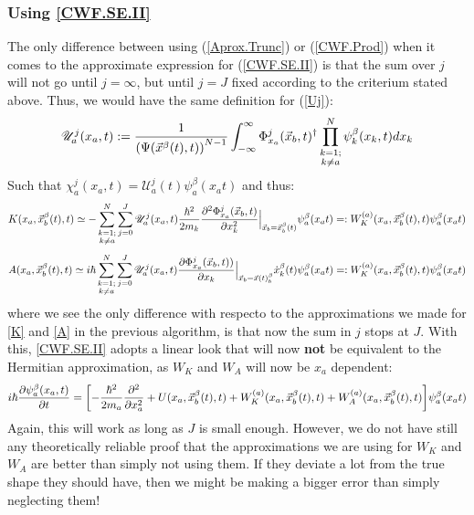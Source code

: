 \documentclass[11pt, a4paper]{article} %
\newcommand{\U}{\mathscr{U}}
\begin{document}
\subsubsection{Using \ref{CWF.SE.II}}
The only difference between using (\ref{Aprox.Trunc}) or (\ref{CWF.Prod}) when it comes to the approximate expression for (\ref{CWF.SE.II}) is that the sum over $j$ will not go until $j=\infty$, but until $j=J$ fixed according to the criterium stated above. Thus, we would have the same definition for (\ref{Uj}):
$$
\U^j_a(x_a, t):=\frac{1}{ \qty(\Psi(\vec{x}^\beta(t),t))^{N-1}} \int_{-\infty}^\infty \Phi_{x_a}^j(\vec{x}_b,t)^\dagger \prod_{\substack{k=1; \\ k\neq a}}^{N} \psi^\beta_k(x_k,t) dx_k 
$$
Such that $\chi_a^j(x_a,t)= \U^j_a(t)\psi_a^\beta(x_a t)$ and thus:
$$
K(x_a, \vec{x}_b^\beta(t), t) \simeq - \sum_{\substack{k=1; \\ k\neq a}}^{N} \sum_{j=0}^J \U^j_a(x_a,t) \frac{\hbar^2}{2m_k} \pdv[2]{ \Phi_{x_a}^j(\vec{x}_b,t)}{x_k}\Big\rvert_{\vec{x}_b=\vec{x}_b^\beta(t)}\psi_a^\beta(x_a t)=:W_K^{(a)}(x_a, \vec{x}_b^\beta (t),t)\psi_a^\beta(x_a t)
$$
$$
A(x_a, \vec{x}_b^\beta(t), t) \simeq i \hbar \sum_{\substack{k=1; \\ k\neq a}}^{N} \sum_{j=0}^J \U^j_a(x_a,t) \pdv{ \Phi_{x_a}^j(\vec{x}_b,t))}{x_k}\Big\rvert_{\vec{x}_b=\vec{x}(t)_b^\beta} \dot{x}_k^\beta(t)\psi_a^\beta(x_a t)=:W_K^{(a)}(x_a, \vec{x}_b^\beta (t),t)\psi_a^\beta(x_a t)
$$
where we see the only difference with respecto to the approximations we made for \ref{K} and \ref{A} in the previous algorithm, is that now the sum in $j$ stops at $J$. With this, \ref{CWF.SE.II} adopts a linear look that will now {\bf not} be equivalent to the Hermitian approximation, as $W_K$ and $W_A$ will now be $x_a$ dependent:
$$
i\hbar \pdv{\psi_a^\beta(x_a, t)}{t} = \qty[- \frac{\hbar^2}{2m_a}\pdv[2]{}{x_a} + U(x_a, \vec{x}_b^\beta(t), t)+ W^{(a)}_K(x_a,\vec{x}_b^\beta (t),t) +W^{(a)}_A(x_a,\vec{x}_b^\beta (t),t) ]\psi_a^\beta(x_a t)
$$
Again, this will work as long as $J$ is small enough. However, we do not have still any theoretically reliable proof that the approximations we are using for $W_K$ and $W_A$ are better than simply not using them. If they deviate a lot from the true shape they should have, then we might be making a bigger error than simply neglecting them!
\end{document}
